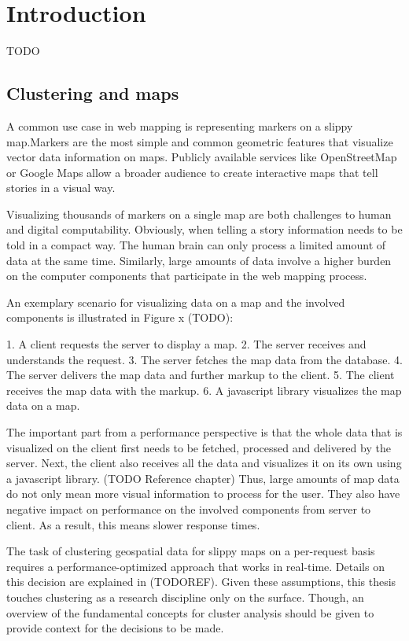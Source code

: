 
%
%

\chapter{Introduction}

TODO


\section{Clustering and maps}

A common use case in web mapping is representing markers on a slippy map.Markers are the most simple and common geometric features that visualize vector data information on maps. Publicly available services like OpenStreetMap or Google Maps allow a broader audience to create interactive maps that tell stories in a visual way.

Visualizing thousands of markers on a single map are both challenges to human and digital computability. Obviously, when telling a story information needs to be told in a compact way. The human brain can only process a limited amount of data at the same time. Similarly, large amounts of data involve a higher burden on the computer components that participate in the web mapping process.

An exemplary scenario for visualizing data on a map and the involved components is illustrated in Figure x (TODO):

1. A client requests the server to display a map.
2. The server receives and understands the request.
3. The server fetches the map data from the database.
4. The server delivers the map data and further markup to the client.
5. The client receives the map data with the markup.
6. A javascript library visualizes the map data on a map.

The important part from a performance perspective is that the whole data that is visualized on the client first needs to be fetched, processed and delivered by the server. Next, the client also receives all the data and visualizes it on its own using a javascript library. (TODO Reference chapter) Thus, large amounts of map data do not only mean more visual information to process for the user. They also have negative impact on performance on the involved components from server to client. As a result, this means slower response times. 

The task of clustering geospatial data for slippy maps on a per-request basis requires a performance-optimized approach that works in real-time. Details on this decision are explained in (TODOREF). Given these assumptions, this thesis touches clustering as a research discipline only on the surface. Though, an overview of the fundamental concepts for cluster analysis should be given to provide context for the decisions to be made.